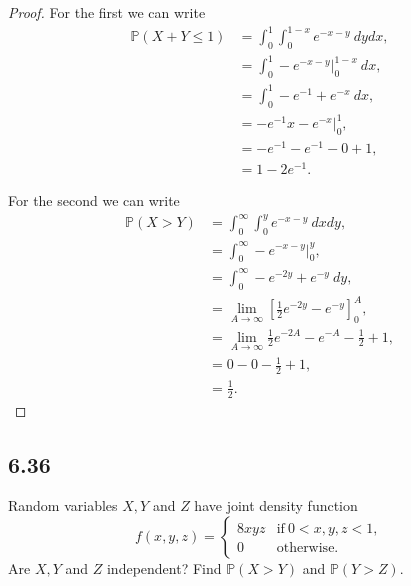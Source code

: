 \documentclass{article}
\renewcommand{\P}[1]{\mathbb{P}(#1)}
\begin{document}
\begin{proof}
    For the first we can write
    \begin{align*}
        \P{X + Y \leq 1} & = \int_0^1 \int_0^{1-x} e^{-x-y} \ dydx,  \\
                         & = \int_0^1 -e^{-x-y} \big |_0^{1-x} \ dx, \\
                         & = \int_0^1 -e^{-1} + e^{-x} \ dx,         \\
                         & = -e^{-1}x - e^{-x} \big |_0^1,           \\
                         & = -e^{-1} - e^{-1} - 0 + 1,               \\
                         & = 1 - 2e^{-1}.
    \end{align*}

    For the second we can write
    \begin{align*}
        \P{X > Y} & = \int_0^\infty \int_0^y e^{-x-y} \ dxdy,                                   \\
                  & = \int_0^\infty -e^{-x-y} \big |_0^y,                                       \\
                  & = \int_0^\infty -e^{-2y} + e^{-y} \ dy,                                     \\
                  & = \lim_{A\rightarrow \infty}[\frac{1}{2}e^{-2y} - e^{-y}]_0^A,              \\
                  & = \lim_{A\rightarrow \infty} \frac{1}{2}e^{-2A} - e^{-A} - \frac{1}{2} + 1, \\
                  & = 0 - 0 -\frac{1}{2} + 1,                                                   \\
                  & = \frac{1}{2}.
    \end{align*}
\end{proof}

\subsection*{6.36}
Random variables $X,Y$ and $Z$ have joint density function
\begin{equation*}
    f(x,y,z) = \begin{cases}
        8xyz & \text{if} \ 0 < x,y,z < 1, \\
        0    & \text{otherwise}.
    \end{cases}
\end{equation*}
Are $X,Y$ and $Z$ independent? Find $\P{X>Y}$ and $\P{Y > Z}$.
\end{document}
